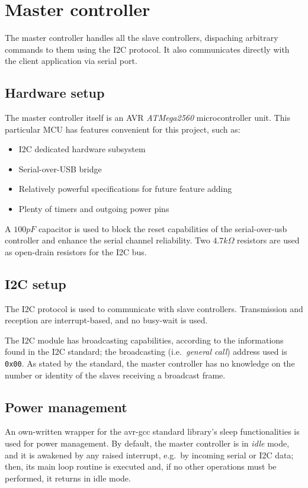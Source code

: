 \chapter{Master controller}
\label{ch:master}
The master controller handles all the slave controllers, dispaching arbitrary
commands to them using the I2C protocol. It also communicates directly with the
client application via serial port.

\section{Hardware setup}
The master controller itself is an AVR \emph{ATMega2560} microcontroller
unit\cite{at2560-ref}. This particular MCU has features convenient for this
project, such as:
\begin{itemize}
  \item I2C dedicated hardware subsystem
  \item Serial-over-USB bridge
  \item Relatively powerful specifications for future feature adding
  \item Plenty of timers and outgoing power pins
\end{itemize}

A $100 pF$ capacitor is used to block the reset capabilities of the
serial-over-usb controller and enhance the serial channel reliability. Two
$4.7 k\Omega$ resistors are used as open-drain resistors for the I2C bus.

\section{I2C setup}
The I2C protocol is used to communicate with slave controllers. Transmission
and reception are interrupt-based, and no busy-wait is used.

The I2C module has broadcasting capabilities, according to the informations
found in the I2C standard\cite{i2c-ref}; the broadcasting (i.e.\
\emph{general call}) address used is \texttt{0x00}. As stated by the standard,
the master controller has no knowledge on the number or identity of the slaves
receiving a broadcast frame.

\section{Power management}
An own-written wrapper for the avr-gcc standard library's sleep functionalities
is used for power management.  By default, the master controller is in
\emph{idle} mode, and it is awakened by any raised interrupt, e.g.\ by incoming
serial or I2C data; then, its main loop routine is executed and, if no other
operations must be performed, it returns in idle mode.

